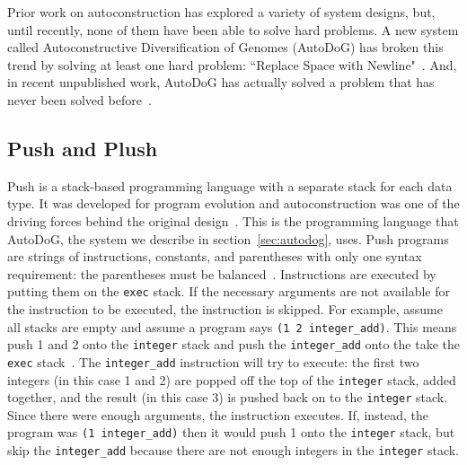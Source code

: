 \documentclass{sig-alternate}
\begin{document}
Prior work on autoconstruction has explored a variety of system designs, but, until recently, none of them have been able to solve hard problems. A new system called Autoconstructive Diversification of Genomes (AutoDoG) has broken this trend by solving at least one hard problem: ``Replace Space with Newline"~\cite{spector:2016}. And, in recent unpublished work, AutoDoG has actually solved a problem that has never been solved before~\cite{eva:2017}.

\subsection{Push and Plush}
\label{sec:push}

Push is a stack-based programming language with a separate stack for each data type. It was developed for program evolution and autoconstruction was one of the driving forces behind the original design~\cite{spector:2016}. This is the programming language that AutoDoG, the system we describe in section~\ref{sec:autodog}, uses. Push programs are strings of instructions, constants, and parentheses with only one syntax requirement: the parentheses must be balanced~\cite{lee:2001}. Instructions are executed by putting them on the \texttt{exec} stack. If the necessary arguments are not available for the instruction to be executed, the instruction is skipped. For example, assume all stacks are empty and assume a program says \texttt{(1 2 integer\_add)}. This means push 1 and 2 onto the \texttt{integer} stack and push the \texttt{integer\_add} onto the take the \texttt{exec} stack~\cite{lee:tutorial}. The \texttt{integer\_add} instruction will try to execute: the first two integers (in this case 1 and 2)  are popped off the top of the \texttt{integer} stack, added together, and the result (in this case 3) is pushed back on to the \texttt{integer} stack. Since there were enough arguments, the instruction executes. If, instead, the program was \texttt{(1 integer\_add)} then it would push 1 onto the \texttt{integer} stack, but skip the \texttt{integer\_add} because there are not enough integers in the \texttt{integer} stack.
\end{document}
